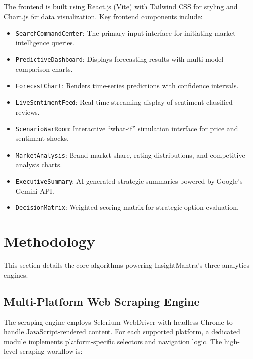 \documentclass[conference]{IEEEtran}
\begin{document}
The frontend is built using React.js (Vite) with Tailwind CSS for styling and Chart.js for data visualization. Key frontend components include:
\begin{itemize}
    \item \texttt{SearchCommandCenter}: The primary input interface for initiating market intelligence queries.
    \item \texttt{PredictiveDashboard}: Displays forecasting results with multi-model comparison charts.
    \item \texttt{ForecastChart}: Renders time-series predictions with confidence intervals.
    \item \texttt{LiveSentimentFeed}: Real-time streaming display of sentiment-classified reviews.
    \item \texttt{ScenarioWarRoom}: Interactive ``what-if'' simulation interface for price and sentiment shocks.
    \item \texttt{MarketAnalysis}: Brand market share, rating distributions, and competitive analysis charts.
    \item \texttt{ExecutiveSummary}: AI-generated strategic summaries powered by Google's Gemini API.
    \item \texttt{DecisionMatrix}: Weighted scoring matrix for strategic option evaluation.
\end{itemize}

\section{Methodology}

This section details the core algorithms powering InsightMantra's three analytics engines.

\subsection{Multi-Platform Web Scraping Engine}

The scraping engine employs Selenium WebDriver with headless Chrome to handle JavaScript-rendered content. For each supported platform, a dedicated module implements platform-specific selectors and navigation logic. The high-level scraping workflow is:
\end{document}
